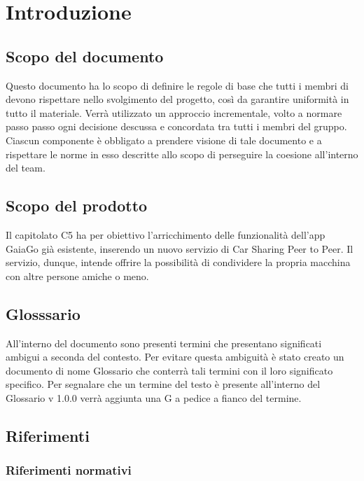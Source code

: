 \documentclass[a4paper]{article}
\begin{document}

\maketitle
\newpage
\tableofcontents
\newpage
\section {Introduzione}
\subsection {Scopo del documento}
Questo documento  ha lo scopo di definire le regole di base che tutti i membri di \GroupName devono rispettare nello svolgimento del progetto, così da garantire uniformità in tutto il materiale. Verrà utilizzato un approccio incrementale, volto a normare passo passo ogni decisione descussa e concordata tra tutti i membri del gruppo. Ciascun componente è obbligato a prendere visione di tale documento e a rispettare le norme in esso descritte allo scopo di perseguire la coesione all'interno del team.
\subsection {Scopo del prodotto}
Il capitolato C5 ha per obiettivo l'arricchimento delle funzionalità dell'app GaiaGo già esistente, inserendo un nuovo servizio di Car Sharing Peer to Peer.
Il servizio, dunque, intende offrire la possibilità di condividere la propria macchina con altre persone amiche o meno.
\subsection {Glosssario}
All’interno del documento sono presenti termini che presentano significati ambigui a seconda del contesto.  Per evitare questa ambiguità è stato creato un documento di nome  Glossario  che  conterrà  tali  termini  con  il  loro  significato  specifico.   Per
segnalare  che  un  termine  del  testo  è  presente  all’interno  del
Glossario  v  1.0.0 verrà aggiunta una G a pedice a fianco del termine.
\subsection {Riferimenti}
\subsubsection {Riferimenti normativi}
\end{document}
